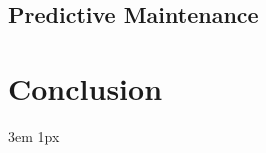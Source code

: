\documentclass{Academic}
\begin{document}
    \subsection{Predictive Maintenance}

    \section{Conclusion}

    \singlespacing
    \emergencystretch 3em
    \hfuzz 1px
    \printbibliography[heading=bibnumbered]




\end{document}
